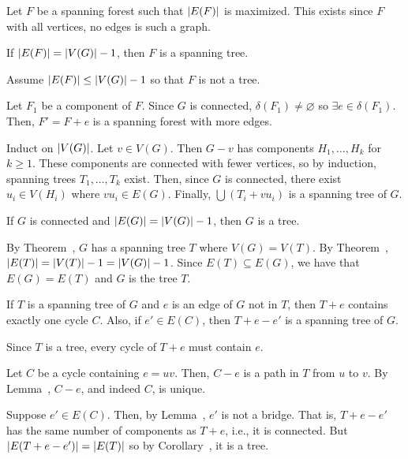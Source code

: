 \documentclass[class=math239,notes,tikz]{agony}
\begin{document}
\begin{prf}
  Let $F$ be a spanning forest such that $\abs{E(F)}$ is maximized.
  This exists since $F$ with all vertices, no edges is such a graph.

  If $\abs{E(F)} = \abs{V(G)} - 1$,
  then $F$ is a spanning tree.

  Assume $\abs{E(F)} \leq \abs{V(G)} - 1$
  so that $F$ is not a tree.

  Let $F_1$ be a component of $F$.
  Since $G$ is connected, $\delta(F_1) \neq \varnothing$
  so $\exists e \in \delta(F_1)$.
  Then, $F' = F + e$ is a spanning forest with more edges.
\end{prf}

\begin{prf}[cute]
  Induct on $\abs{V(G)}$.
  Let $v \in V(G)$. Then $G-v$ has components $H_1,\dotsc,H_k$ for $k \geq 1$.
  These components are connected with fewer vertices,
  so by induction, spanning trees $T_1,\dotsc,T_k$ exist.
  Then, since $G$ is connected, there exist $u_i \in V(H_i)$ where $vu_i \in E(G)$.
  Finally, $\bigcup (T_i + vu_i)$ is a spanning tree of $G$.
\end{prf}

\begin{corollary}[5.2.2]\label{cor:treenum}
  If $G$ is connected and $\abs{E(G)} = \abs{V(G)} - 1$, then $G$ is a tree.
\end{corollary}
\begin{prf}
  By Theorem~, $G$ has a spanning tree $T$ where $V(G) = V(T)$.
  By Theorem~, $\abs{E(T)} = \abs{V(T)} - 1 = \abs{V(G)} - 1$.
  Since $E(T) \subseteq E(G)$, we have that $E(G) = E(T)$ and $G$ is the tree $T$.
\end{prf}

\begin{theorem}[5.2.3]
  If $T$ is a spanning tree of $G$ and $e$ is an edge of $G$ not in $T$,
  then $T + e$ contains exactly one cycle $C$.
  Also, if $e' \in E(C)$, then $T + e - e'$ is a spanning tree of $G$.
\end{theorem}\spewnotes
\begin{prf}
  Since $T$ is a tree, every cycle of $T+e$ must contain $e$.

  Let $C$ be a cycle containing $e = uv$.
  Then, $C-e$ is a path in $T$ from $u$ to $v$.
  By Lemma~, $C-e$, and indeed $C$, is unique.

  Suppose $e' \in E(C)$.
  Then, by Lemma~, $e'$ is not a bridge.
  That is, $T+e-e'$ has the same number of components as $T+e$, i.e., it is connected.
  But $\abs{E(T+e-e')} = \abs{E(T)}$ so by Corollary~, it is a tree.
\end{prf}
\end{document}

